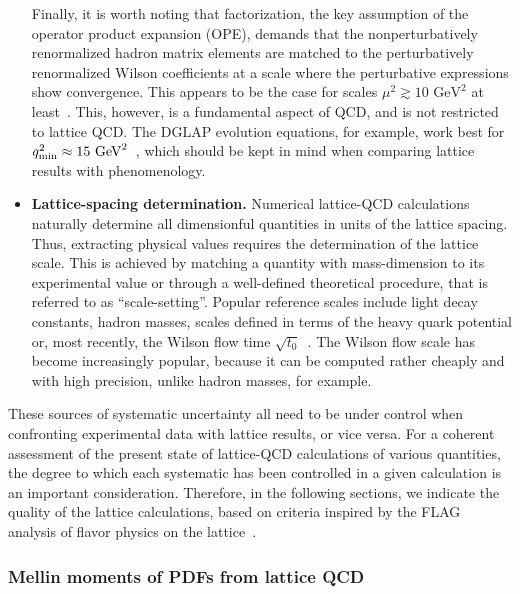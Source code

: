 \begin{itemize}
Finally, it is worth noting that factorization, the key assumption of
the operator product expansion (OPE), demands that the
nonperturbatively renormalized hadron matrix elements are matched to the
perturbatively renormalized Wilson coefficients at a scale where the perturbative 
expressions show convergence. This appears to be
the case for scales $\mu^2 \gtrsim 10\mbox{ GeV}^2$ at
least~\cite{Gockeler:2010yr}. This, however, is a fundamental aspect
of QCD, and is not restricted to lattice QCD. The DGLAP evolution equations,
for example, work best for $q^2_{\rm min} \approx
15\mbox{ GeV}^2$~\cite{Abramowicz:2015mha}, which should be kept in
mind when comparing lattice results with phenomenology.

\item {\bfseries Lattice-spacing determination.} Numerical lattice-QCD calculations 
naturally determine all dimensionful quantities in units of the
lattice spacing. Thus, extracting physical values requires the
determination of the lattice scale. This is achieved by matching a
quantity with mass-dimension to its experimental value or through a
well-defined theoretical procedure, that is referred to as
``scale-setting''. Popular reference scales include light decay
constants, hadron masses, scales defined in terms of the heavy quark
potential or, most recently, the Wilson flow time
$\sqrt{t_0}$~\cite{Luscher:2010iy}. The Wilson flow scale has become
increasingly popular, because it can be computed rather cheaply and
with high precision, unlike hadron masses, for example.

\end{itemize}

These sources of systematic uncertainty all need to be under control
when confronting experimental data with lattice results, or vice
versa.
%
For a coherent assessment of the present state of lattice-QCD
calculations of various quantities, the degree to which each
systematic has been controlled in a given calculation is an important
consideration.
%
Therefore, in the following sections, we indicate the
quality of the lattice calculations, based on criteria inspired by the
FLAG analysis of flavor physics on the lattice~\cite{Aoki:2016frl}.


\subsubsection{Mellin moments of PDFs from lattice QCD}
\label{Sec:MomentsLQCD}

